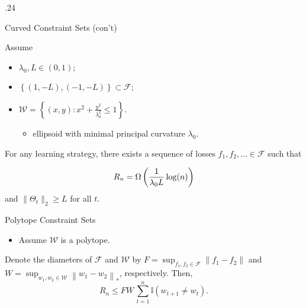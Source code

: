 \documentclass[final]{beamer} %
\newcommand{\cW}{\mathcal{W}}
\newcommand{\cF}{\mathcal{F}}
\newcommand{\ind}{\mathbb{I}}
\newcommand{\seto}[1]{\left\{#1\right\}}
\newcommand{\norm}[1]{\left\| #1 \right\|}
\begin{document}
\begin{frame}[c]
\begin{columns}[t,totalwidth=\textwidth]
\begin{column} {.24\textwidth}
\begin{block}{Curved Constraint Sets (con't)}
			
			\begin{tcolorbox}[title = \vspace{0.4cm}\textbf{\large Result II (Lower Bound)} \vspace{0.4cm}, title filled, width = 0.9\textwidth, colback = uofagreen!10, colframe = red, arc = 16pt]
			Assume
			\begin{itemize}
				\item  $\lambda_0,L \in (0,1)$;
				\item $\seto{(1,-L), (-1,-L)} \subset \cF$; 
				\item $\cW = \seto{(x,y): x^2 + \frac{y^2}{\lambda_0^2} \le 1}$.
				\begin{itemize}
					\item \small ellipsoid with minimal principal curvature $\lambda_0$.
				\end{itemize}
			\end{itemize}
			\bigskip
				For any learning strategy, there exists a sequence of losses $f_1,f_2,\ldots \in \cF$ such that 

				\[
				R_n = \Omega\left(\frac{1}{\lambda_0L} \log(n)\right) \bigskip
				\]				
				and $\|\Theta_t\|_2 \ge L$ for all $t$.
			\end{tcolorbox}
			
		
		
		\end{block}
		
		\vspace{0.0ex}
		\begin{block}{Polytope Constraint Sets }
			\begin{itemize}
				\item Assume $\cW$ is a polytope.
			\end{itemize}
			\begin{tcolorbox}[title = \vspace{0.4cm}\textbf{\large Result III (Upper Bound)} \vspace{0.4cm}, title filled, width = 0.9\textwidth, colback = uofagreen!10, colframe = red, arc = 16pt]
				Denote the diameters of $\cF$ and $\cW$ by $F = \sup_{f_1,f_2\in \cF} \norm{f_1-f_2}$ and $W = \sup_{w_1,w_2\in \cW}  \norm{w_1-w_2}_*$, respectively.
				Then,
				 \[R_n \le FW\, \sum_{t=1}^{n} \ind(w_{t+1}\neq w_{t}).\]
			\end{tcolorbox}


\end{block}
\end{column}
\end{columns}
\end{frame}
\end{document}
